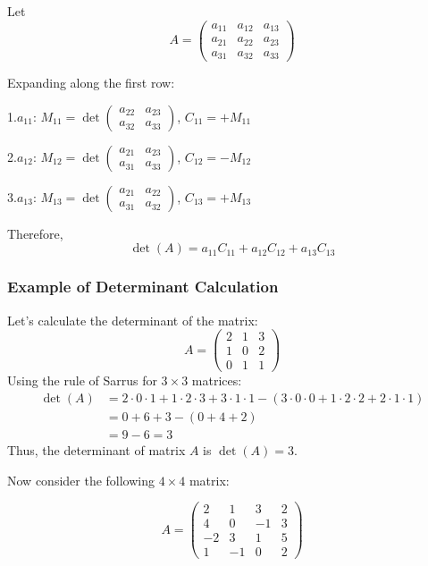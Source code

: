 Let
\[
A = \begin{pmatrix}
a_{11} & a_{12} & a_{13} \\
a_{21} & a_{22} & a_{23} \\
a_{31} & a_{32} & a_{33}
\end{pmatrix}
\]

Expanding along the first row:

1.\(a_{11}\):  \(M_{11} = \det \begin{pmatrix} a_{22} & a_{23} \\ a_{32} & a_{33} \end{pmatrix}\),  \(C_{11} = +M_{11}\)

2.\(a_{12}\):  \(M_{12} = \det \begin{pmatrix} a_{21} & a_{23} \\ a_{31} & a_{33} \end{pmatrix}\),  \(C_{12} = -M_{12}\)

3.\(a_{13}\):  \(M_{13} = \det \begin{pmatrix} a_{21} & a_{22} \\ a_{31} & a_{32} \end{pmatrix}\),  \(C_{13} = +M_{13}\)

Therefore,
\[
\det(A) = a_{11}C_{11} + a_{12}C_{12} + a_{13}C_{13}
\]


\subsubsection{Example of Determinant Calculation}
Let's calculate the determinant of the matrix:
\begin{equation*}
A =
\begin{pmatrix}
2 & 1 & 3 \\
1 & 0 & 2 \\
0 & 1 & 1
\end{pmatrix}
\end{equation*}
Using the rule of Sarrus for $3 \times 3$ matrices:
\begin{align*}
\det(A) &= 2 \cdot 0 \cdot 1 + 1 \cdot 2 \cdot 3 + 3 \cdot 1 \cdot 1 - (3 \cdot 0 \cdot 0 + 1 \cdot 2 \cdot 2 + 2 \cdot 1 \cdot 1) \\
&= 0 + 6 + 3 - (0 + 4 + 2) \\
&= 9 - 6 = 3
\end{align*}
\noindent Thus, the determinant of matrix $A$ is $\det(A) = 3$.

\noindent Now consider the following $4 \times 4$ matrix:

\begin{equation*}
A = 
\begin{pmatrix}
2 & 1 & 3 & 2 \\
4 & 0 & -1 & 3 \\
-2 & 3 & 1 & 5 \\
1 & -1 & 0 & 2
\end{pmatrix}
\end{equation*}

